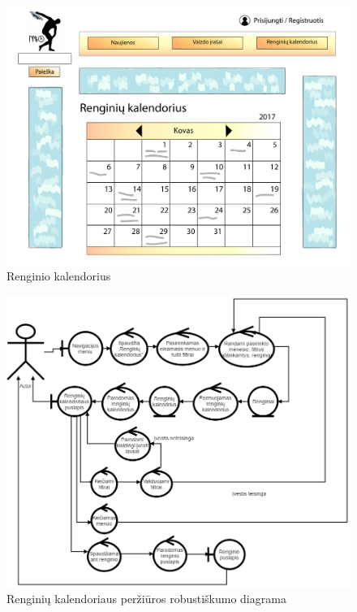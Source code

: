 \documentclass{VUMIFPSkursinis}
\begin{document}
\begin{enumerate} [label = \textbf{U\arabic*.}]
				\begin{figure}[H]
						\centering
						\includegraphics[width=\textwidth]{img/PSI4/RenginioKalendorius-01.jpg}
						\caption{Renginio kalendorius}
						\label{fig:uzd_reginioKalendorius}
					\end{figure}
					
				\begin{figure}[H]
					\centering
					\includegraphics[width=\textwidth]{img/PSI5/U2.png}
					\caption{Renginių kalendoriaus peržiūros robustiškumo diagrama}
					\label{draw:u2}
				\end{figure}	


\end{enumerate}
\end{document}

